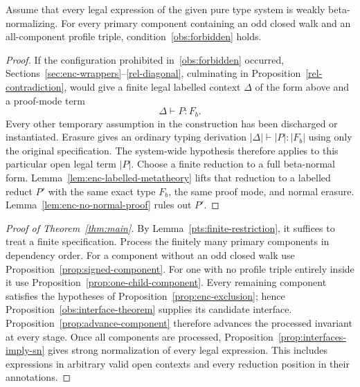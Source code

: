 \begin{proposition}
\label{prop:enc-exclusion}
Assume that every legal expression of the given pure type system is weakly
beta-normalizing.  For every primary component containing an odd closed walk and an
all-component profile triple, condition~\eqref{obs:forbidden} holds.
\end{proposition}

\begin{proof}
If the configuration prohibited in~\eqref{obs:forbidden} occurred,
Sections~\ref{sec:enc-wrappers}--\ref{rel-diagonal}, culminating in
Proposition~\ref{rel-contradiction}, would give a
finite legal labelled context $\Delta$ of the form above and a proof-mode
term
\[
                 \Delta\vdash P:F_b.
\]
Every other temporary assumption in the construction has been discharged
or instantiated.  Erasure gives an ordinary typing derivation
$|\Delta|\vdash |P|:|F_b|$ using only the original specification.
The system-wide hypothesis therefore applies to this particular open
legal term $|P|$.  Choose a finite reduction to a full beta-normal form.
Lemma~\ref{lem:enc-labelled-metatheory} lifts that reduction to a labelled
reduct $P'$ with the same exact type $F_b$, the same proof mode, and normal
erasure.  Lemma~\ref{lem:enc-no-normal-proof} rules out $P'$.
\end{proof}


\begin{proof}[Proof of Theorem~\ref{thm:main}]
By Lemma~\ref{pts:finite-restriction}, it suffices to treat a finite
specification. Process the finitely many primary components in dependency
order. For a component without an odd closed walk use
Proposition~\ref{prop:signed-component}. For one with no profile triple
entirely inside it use Proposition~\ref{prop:one-child-component}.
Every remaining component satisfies the hypotheses of
Proposition~\ref{prop:enc-exclusion}; hence
Proposition~\ref{obs:interface-theorem} supplies its candidate interface.
Proposition~\ref{prop:advance-component} therefore advances the
processed invariant at every stage. Once all components are processed,
Proposition~\ref{prop:interfaces-imply-sn} gives strong normalization
of every legal expression. This includes expressions in arbitrary valid
open contexts and every reduction position in their annotations.
\end{proof}
